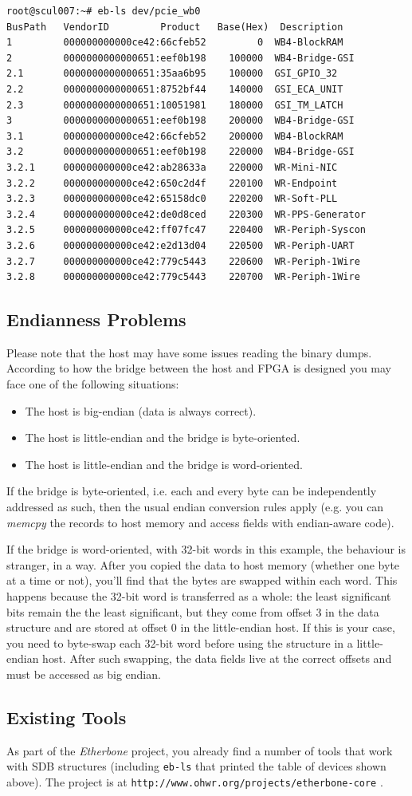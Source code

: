 \documentclass[a4paper, 12pt]{article}
\begin{document}
\footnotesize
\begin{verbatim}
root@scul007:~# eb-ls dev/pcie_wb0
BusPath   VendorID         Product   Base(Hex)  Description
1         000000000000ce42:66cfeb52         0  WB4-BlockRAM
2         0000000000000651:eef0b198    100000  WB4-Bridge-GSI
2.1       0000000000000651:35aa6b95    100000  GSI_GPIO_32
2.2       0000000000000651:8752bf44    140000  GSI_ECA_UNIT
2.3       0000000000000651:10051981    180000  GSI_TM_LATCH
3         0000000000000651:eef0b198    200000  WB4-Bridge-GSI
3.1       000000000000ce42:66cfeb52    200000  WB4-BlockRAM
3.2       0000000000000651:eef0b198    220000  WB4-Bridge-GSI
3.2.1     000000000000ce42:ab28633a    220000  WR-Mini-NIC
3.2.2     000000000000ce42:650c2d4f    220100  WR-Endpoint
3.2.3     000000000000ce42:65158dc0    220200  WR-Soft-PLL
3.2.4     000000000000ce42:de0d8ced    220300  WR-PPS-Generator
3.2.5     000000000000ce42:ff07fc47    220400  WR-Periph-Syscon
3.2.6     000000000000ce42:e2d13d04    220500  WR-Periph-UART
3.2.7     000000000000ce42:779c5443    220600  WR-Periph-1Wire
3.2.8     000000000000ce42:779c5443    220700  WR-Periph-1Wire
\end{verbatim}
\normalsize

\subsection{Endianness Problems}

Please note that the host may have some issues reading the binary
dumps. According to how the bridge between the host and FPGA is
designed you may face one of the following situations:

\begin{itemize}
\item The host is big-endian (data is always correct).
\item The host is little-endian and the bridge is byte-oriented.
\item The host is little-endian and the bridge is word-oriented.
\end{itemize}

If the bridge is byte-oriented, i.e. each and every byte can be
independently addressed as such, then the usual endian conversion
rules apply (e.g. you can \textit{memcpy} the records to host memory
and access fields with endian-aware code).

If the bridge is word-oriented, with 32-bit words in this example, the behaviour is stranger, in
a way.  After you copied the data to host memory (whether one byte at
a time or not), you'll find that the bytes are swapped within each word.
This happens because the 32-bit word is transferred as a whole: the least significant
bits remain the the least significant, but they come from offset 3 in the data structure
and are stored at offset 0 in the little-endian host.  If this is your case, you need to
byte-swap each 32-bit word before using the structure in a
little-endian host. After such swapping, the data fields live at the correct
offsets and must be accessed as big endian.

\subsection{Existing Tools}

As part of the \textit{Etherbone} project, you already find a number
of tools that work with SDB structures (including \texttt{eb-ls} that
printed the table of devices shown above).  The project is at
\texttt{http://www.ohwr.org/projects/etherbone-core} .
\end{document}

